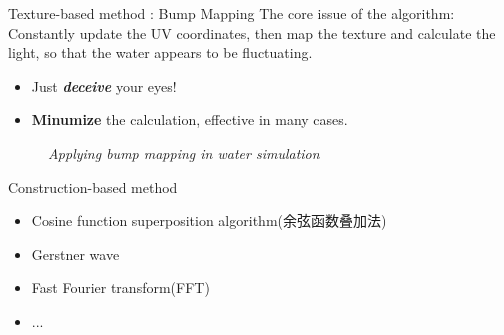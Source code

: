 \documentclass{beamer}
\begin{document}
\begin{frame}{Texture-based method : Bump Mapping}
  The core issue of the algorithm:  Constantly update the UV coordinates, then map the texture and calculate the light, so that the water appears to be fluctuating.
  \begin{itemize}
    \item \textcolor[rgb]{0,0,1}{\large Just \textcolor[rgb]{1,0,0}{\textbf{\emph{deceive}}} your eyes!}
    \item \textcolor[rgb]{0,0,1}{\textbf{Minumize} the calculation, effective in many cases.}
  \end{itemize}

  \begin{figure}[thpb]
    \centering
    \caption*{\emph{Applying bump mapping in water simulation}}
  \label{fig:system}
  \end{figure}
\end{frame}
\begin{frame}{Construction-based method}
  \begin{itemize}
    \item Cosine function superposition algorithm(余弦函数叠加法)
    \item Gerstner wave
    \item Fast Fourier transform(FFT)
    \item ...
  \end{itemize}
\end{frame}
\end{document}
